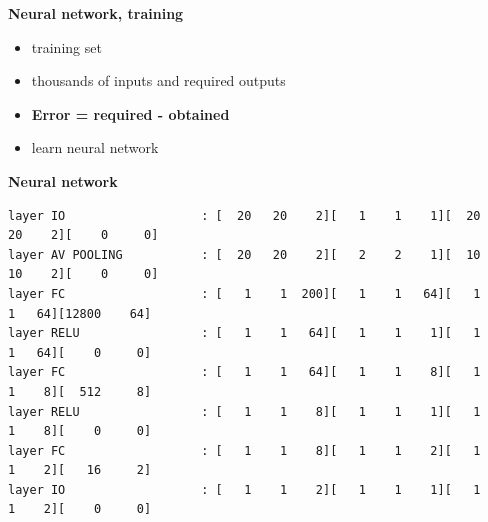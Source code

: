 \documentclass[xcolor=dvipsnames]{beamer}
\begin{document}
\begin{frame}{\bf Neural network, training}
\begin{minipage}{.5\textwidth}
\end{minipage}%
\begin{minipage}{.5\textwidth}

  \begin{itemize}
    \item training set
    \item thousands of inputs and required outputs
    \item {\small \bf Error = required - obtained}
    \item learn neural network
  \end{itemize}

\end{minipage}

\end{frame}


\begin{frame}[fragile]
{\bf Neural network}


{\tiny
\begin{verbatim}
layer IO                   : [  20   20    2][   1    1    1][  20   20    2][    0     0]
layer AV POOLING           : [  20   20    2][   2    2    1][  10   10    2][    0     0]
layer FC                   : [   1    1  200][   1    1   64][   1    1   64][12800    64]
layer RELU                 : [   1    1   64][   1    1    1][   1    1   64][    0     0]
layer FC                   : [   1    1   64][   1    1    8][   1    1    8][  512     8]
layer RELU                 : [   1    1    8][   1    1    1][   1    1    8][    0     0]
layer FC                   : [   1    1    8][   1    1    2][   1    1    2][   16     2]
layer IO                   : [   1    1    2][   1    1    1][   1    1    2][    0     0]
\end{verbatim}
}

\end{frame}
\end{document}
